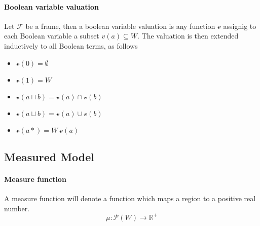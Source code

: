 \documentclass{article}
\begin{document}
	\paragraph{Boolean variable valuation}
Let $\mathcal{F}$  be a frame, then a boolean variable valuation is any function $\mathscr{v}$ assignig to each Boolean variable a subset $v(a) \subseteq W$. The valuation is then extended inductively to all Boolean terms, as follows
		\begin{itemize}
			\item $\mathscr{v}(0) = \emptyset$
			\item $\mathscr{v}(1) = W$
			\item $\mathscr{v}(a \sqcap b) = \mathscr{v}(a) \cap \mathscr{v}(b)$
			\item $\mathscr{v}(a \sqcup b) = \mathscr{v}(a) \cup \mathscr{v}(b)$
			\item $\mathscr{v}(a*) = W \ \mathscr{v}(a)$
		\end{itemize}

	\subsection{Measured Model}

	\paragraph{Measure function} A measure function will denote a function which maps a region to a positive real number.
		\begin{equation*}
			\mu : \mathscr{P}(W) \longrightarrow \mathbb{R}^+
		\end{equation*}
\end{document}
